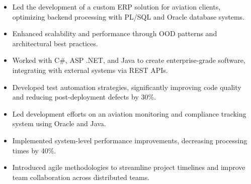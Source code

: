 \par\smallskip
\noindent
\begin{minipage}{20cm}
  \begin{minipage}{9.75cm}
    \begin{itemize}
      \item Led the development of a custom ERP solution for aviation clients, optimizing backend processing with PL/SQL and Oracle database systems.
      \item Enhanced scalability and performance through OOD patterns and architectural best practices.
    \end{itemize}
  \end{minipage}
  \hfill
  \begin{minipage}{9.75cm}
    \begin{itemize}
      \item Worked with C#, ASP .NET, and Java to create enterprise-grade software, integrating with external systems via REST APIs.
      \item Developed test automation strategies, significantly improving code quality and reducing post-deployment defects by 30\%.
    \end{itemize}
  \end{minipage}
\end{minipage}
\par\smallskip
\divider

\par\smallskip
\noindent
\begin{minipage}{20cm}
  \begin{minipage}{9.75cm}
    \begin{itemize}
      \item Led development efforts on an aviation monitoring and compliance tracking system using Oracle and Java.
      \item Implemented system-level performance improvements, decreasing processing times by 40\%.
    \end{itemize}
  \end{minipage}
  \hfill
  \begin{minipage}{9.75cm}
    \begin{itemize}
      \item Introduced agile methodologies to streamline project timelines and improve team collaboration across distributed teams.
    \end{itemize}
  \end{minipage}
\end{minipage}

